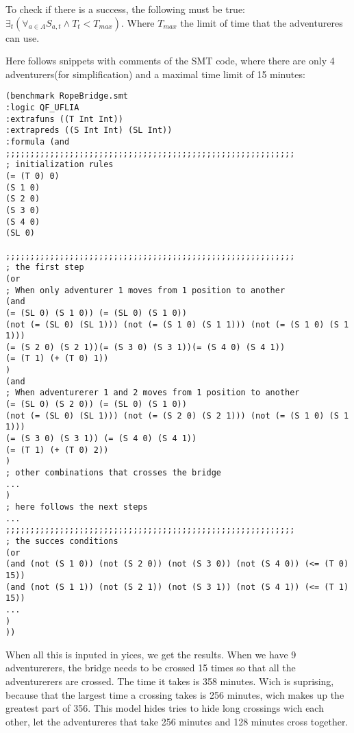 To check if there is a success, the following must be true: $\exists_{t}(\forall_{a \in A} S_{a, t} \land T_{t} < T_{max})$. Where $T_{max}$ the limit of time that the adventureres can use.

Here follows snippets with comments of the SMT code, where there are only 4 adventurers(for simplification) and a maximal time limit of 15 minutes:

\begin{verbatim}
(benchmark RopeBridge.smt
:logic QF_UFLIA
:extrafuns ((T Int Int))
:extrapreds ((S Int Int) (SL Int))
:formula (and
;;;;;;;;;;;;;;;;;;;;;;;;;;;;;;;;;;;;;;;;;;;;;;;;;;;;;;;;;;;
; initialization rules
(= (T 0) 0)
(S 1 0)
(S 2 0)
(S 3 0)
(S 4 0)
(SL 0)

;;;;;;;;;;;;;;;;;;;;;;;;;;;;;;;;;;;;;;;;;;;;;;;;;;;;;;;;;;;
; the first step
(or
; When only adventurer 1 moves from 1 position to another
(and 
(= (SL 0) (S 1 0)) (= (SL 0) (S 1 0)) 
(not (= (SL 0) (SL 1))) (not (= (S 1 0) (S 1 1))) (not (= (S 1 0) (S 1 1))) 
(= (S 2 0) (S 2 1))(= (S 3 0) (S 3 1))(= (S 4 0) (S 4 1)) 
(= (T 1) (+ (T 0) 1))
)
(and 
; When adventurerer 1 and 2 moves from 1 position to another
(= (SL 0) (S 2 0)) (= (SL 0) (S 1 0)) 
(not (= (SL 0) (SL 1))) (not (= (S 2 0) (S 2 1))) (not (= (S 1 0) (S 1 1))) 
(= (S 3 0) (S 3 1)) (= (S 4 0) (S 4 1)) 
(= (T 1) (+ (T 0) 2))
)
; other combinations that crosses the bridge
...
)
; here follows the next steps
...
;;;;;;;;;;;;;;;;;;;;;;;;;;;;;;;;;;;;;;;;;;;;;;;;;;;;;;;;;;;
; the succes conditions
(or
(and (not (S 1 0)) (not (S 2 0)) (not (S 3 0)) (not (S 4 0)) (<= (T 0) 15))
(and (not (S 1 1)) (not (S 2 1)) (not (S 3 1)) (not (S 4 1)) (<= (T 1) 15))
...
)
))
\end{verbatim}

When all this is inputed in yices, we get the results. When we have 9 adventurerers, the bridge needs to be crossed 15 times so that all the adventurerers are crossed. The time it takes is 358 minutes. Wich is suprising, because that the largest time a crossing takes is 256 minutes, wich makes up the greatest part of 356. This model hides tries to hide long crossings wich each other, let the adventureres that take 256 minutes and 128 minutes cross together.
